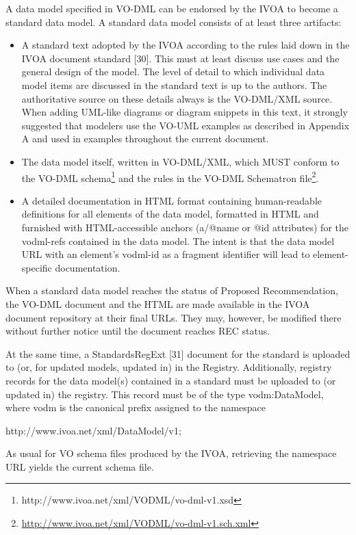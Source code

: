 \documentclass[10pt,a4paper]{ivoa}
\begin{document}
A data model specified in VO-DML can be endorsed by the IVOA to become a
standard data model. A standard data model consists of at least three
artifacts:

\begin{itemize}
\item
  A standard text adopted by the IVOA according to the rules laid down
  in the IVOA document standard {[}30{]}. This must at least discuss use
  cases and the general design of the model. The level of detail to
  which individual data model items are discussed in the standard text
  is up to the authors. The authoritative source on these details always
  is the VO-DML/XML source. When adding UML-like diagrams or diagram
  snippets in this text, it strongly suggested that modelers use the
  VO-UML examples as described in Appendix A and used in examples
  throughout the current document.
\item
  The data model itself, written in VO-DML/XML, which MUST conform to
  the VO-DML schema\footnote{http://www.ivoa.net/xml/VODML/vo-dml-v1.xsd}
  and the rules in the VO-DML Schematron file\footnote{\url{http://www.ivoa.net/xml/VODML/vo-dml-v1.sch.xml}}.
\item
  A detailed documentation in HTML format containing human-readable
  definitions for all elements of the data model, formatted in HTML and
  furnished with HTML-accessible anchors (a/@name or @id attributes) for
  the vodml-refs contained in the data model. The intent is that the
  data model URL with an element's vodml-id as a fragment identifier
  will lead to element-specific documentation.
\end{itemize}

When a standard data model reaches the status of Proposed
Recommendation, the VO-DML document and the HTML are made available in
the IVOA document repository at their final URLs. They may, however, be
modified there without further notice until the document reaches REC
status.

At the same time, a StandardsRegExt {[}31{]} document for the standard
is uploaded to (or, for updated models, updated in) in the Registry.
Additionally, registry records for the data model(s) contained in a
standard must be uploaded to (or updated in) the registry. This record
must be of the type vodm:DataModel, where vodm is the canonical prefix
assigned to the namespace

http://www.ivoa.net/xml/DataModel/v1;

As usual for VO schema files produced by the IVOA, retrieving the
namespace URL yields the current schema file.
\end{document}

